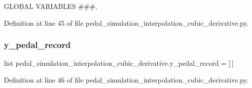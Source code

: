 G\+L\+O\+B\+AL V\+A\+R\+I\+A\+B\+L\+ES \#\#\#. 



Definition at line 45 of file pedal\+\_\+simulation\+\_\+interpolation\+\_\+cubic\+\_\+derivative.\+py.

\mbox{\label{namespacepedal__simulation__interpolation__cubic__derivative_a237b936a014f1444eea759e6081f5d4f}} 
\subsubsection{\texorpdfstring{y\_pedal\_record}{y\_pedal\_record}}
{\footnotesize\ttfamily list pedal\+\_\+simulation\+\_\+interpolation\+\_\+cubic\+\_\+derivative.\+y\+\_\+pedal\+\_\+record = \mbox{[}$\,$\mbox{]}}



Definition at line 46 of file pedal\+\_\+simulation\+\_\+interpolation\+\_\+cubic\+\_\+derivative.\+py.

